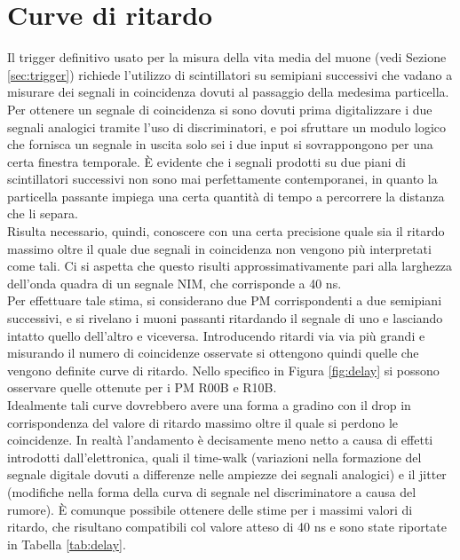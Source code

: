 \documentclass{standalone}
\begin{document}
	\section{Curve di ritardo}
	\label{sec:delay}
	Il trigger definitivo usato per la misura della vita media del muone (vedi Sezione \ref{sec:trigger}) richiede l'utilizzo di scintillatori su semipiani successivi che vadano a misurare dei segnali in coincidenza dovuti al passaggio della medesima particella.\\
	Per ottenere un segnale di coincidenza si sono dovuti prima digitalizzare i due segnali analogici tramite l'uso di discriminatori, e poi sfruttare un modulo logico che fornisca un segnale in uscita solo sei i due input si sovrappongono per una certa finestra temporale. \`E evidente che i segnali prodotti su due piani di scintillatori successivi non sono mai perfettamente contemporanei, in quanto la particella passante impiega una certa quantit\`a di tempo a percorrere la distanza che li separa. \\
	Risulta necessario, quindi, conoscere con una certa precisione quale sia il ritardo massimo oltre il quale due segnali in coincidenza non vengono pi\`u interpretati come tali. Ci si aspetta che questo risulti approssimativamente pari alla larghezza dell'onda quadra di un segnale NIM, che corrisponde a 40 ns.\\
	Per effettuare tale stima, si considerano due  PM corrispondenti a due semipiani successivi, e si rivelano i muoni passanti ritardando il segnale di uno e lasciando intatto quello dell'altro e viceversa. Introducendo ritardi via via pi\`u grandi e misurando il numero di coincidenze osservate si ottengono quindi quelle che vengono definite curve di ritardo. Nello specifico in Figura \ref{fig:delay} si possono osservare quelle ottenute per i PM R00B e R10B.\\
	Idealmente tali curve dovrebbero avere una forma a gradino con il drop in corrispondenza del valore di ritardo massimo oltre il quale si perdono le coincidenze. In realt\`a l'andamento \`e decisamente meno netto a causa di effetti introdotti dall'elettronica, quali il time-walk (variazioni nella formazione del segnale digitale dovuti a differenze nelle ampiezze dei segnali analogici)  e il jitter (modifiche nella forma della curva di segnale nel discriminatore a causa del rumore). \`E comunque possibile ottenere delle stime per i massimi valori di ritardo, che risultano compatibili col valore atteso di 40 ns e sono state riportate in Tabella \ref{tab:delay}.
\end{document}
